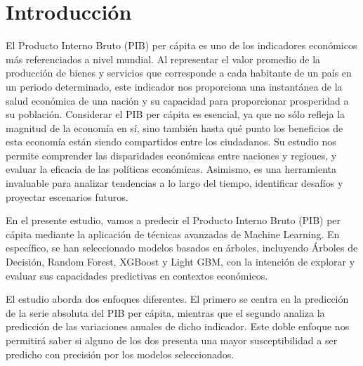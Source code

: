 \documentclass[12pt]{article}
\begin{document}
\tableofcontents

\newpage






\section{Introducción}

El Producto Interno Bruto (PIB) per cápita es uno de los indicadores económicos más referenciados a nivel mundial. Al representar el valor promedio de la producción de bienes y servicios que corresponde a cada habitante de un país en un periodo determinado, este indicador nos proporciona una instantánea de la salud económica de una nación y su capacidad para proporcionar prosperidad a su población. Considerar el PIB per cápita es esencial, ya que no sólo refleja la magnitud de la economía en sí, sino también hasta qué punto los beneficios de esta economía están siendo compartidos entre los ciudadanos. Su estudio nos permite comprender las disparidades económicas entre naciones y regiones, y evaluar la eficacia de las políticas económicas. Asimismo, es una herramienta invaluable para analizar tendencias a lo largo del tiempo, identificar desafíos y proyectar escenarios futuros.

En el presente estudio, vamos a predecir el Producto Interno Bruto (PIB) per cápita mediante la aplicación de técnicas avanzadas de Machine Learning. En específico, se han seleccionado modelos basados en árboles, incluyendo Árboles de Decisión, Random Forest, XGBoost y Light GBM, con la intención de explorar y evaluar sus capacidades predictivas en contextos económicos.

El estudio aborda dos enfoques diferentes. El primero se centra en la predicción de la serie absoluta del PIB per cápita, mientras que el segundo analiza la predicción de las variaciones anuales de dicho indicador. Este doble enfoque nos permitirá saber si alguno de los dos presenta una mayor susceptibilidad a ser predicho con precisión por los modelos seleccionados.
\end{document}
